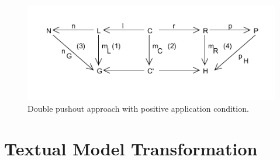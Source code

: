 \begin{figure}[H]
	\centering
	\includegraphics[scale=0.7]{./Figures/Double_Pushout_PAC.png}
	\caption[The Double Pushout approach with PAC]
	{Double pushout approach with positive application condition.}
	\label{fig:DPO_NAC}
\end{figure}

\section{Textual Model Transformation}



